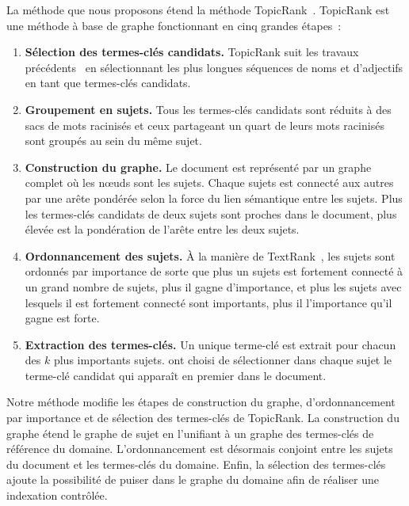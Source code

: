   La méthode que nous proposons étend la méthode
  TopicRank~\cite{bougouin2013topicrank}. TopicRank est une méthode à base de
  graphe fonctionnant en cinq grandes étapes~:
  \begin{enumerate}
    \item{\textbf{Sélection des termes-clés candidats.} TopicRank suit les
          travaux précédents~\cite{wan2008expandrank,hassan2010conundrums} en
          sélectionnant les plus longues séquences de noms et d'adjectifs en
          tant que termes-clés candidats.}
    \item{\textbf{Groupement en sujets.} Tous les termes-clés candidats sont
          réduits à des sacs de mots racinisés et ceux partageant
          un quart de leurs mots racinisés sont groupés au sein du
          même sujet.}
    \item{\textbf{Construction du graphe.} Le document est représenté par un
          graphe complet où les n\oe{}uds sont les sujets. Chaque sujets est
          connecté aux autres par une arête pondérée selon la force du lien
          sémantique entre les sujets. Plus les
          termes-clés candidats de deux sujets sont proches dans le document,
          plus élevée est la pondération de l'arête entre les deux sujets.}
    \item{\textbf{Ordonnancement des sujets.} À la manière de
          TextRank~\cite{mihalcea2004textrank}, les sujets sont ordonnés par
          importance de sorte que plus un sujets est fortement connecté à un
          grand nombre de sujets, plus il gagne d'importance, et plus les
          sujets avec lesquels il est fortement connecté sont importants, plus
          il l'importance qu'il gagne est forte.}
    \item{\textbf{Extraction des termes-clés.} Un unique terme-clé est extrait
          pour chacun des $k$ plus importants sujets.
           ont choisi de sélectionner dans chaque
          sujet le terme-clé candidat qui apparaît en premier dans le document.}
  \end{enumerate}
  
  Notre méthode modifie les étapes de construction du graphe, d'ordonnancement
  par importance et de sélection des termes-clés de TopicRank. La
  construction du graphe étend le graphe de sujet en
  l'unifiant à un graphe des termes-clés de référence du domaine.
  L'ordonnancement est désormais conjoint entre les sujets du document et les
  termes-clés du domaine. Enfin, la sélection des termes-clés ajoute la
  possibilité de puiser dans le graphe du domaine afin de réaliser une
  indexation contrôlée.

